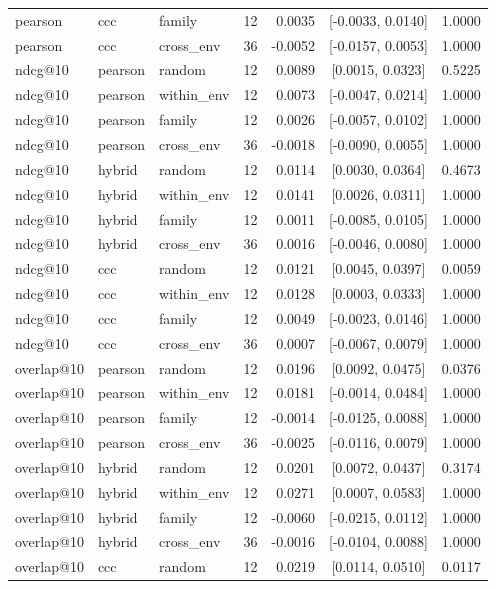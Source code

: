 \begin{longtable}{lllrrcc}
pearson & ccc & family & 12 & 0.0035 & [-0.0033, 0.0140] & 1.0000 \\
pearson & ccc & cross\_env & 36 & -0.0052 & [-0.0157, 0.0053] & 1.0000 \\
ndcg@10 & pearson & random & 12 & 0.0089 & [0.0015, 0.0323] & 0.5225 \\
ndcg@10 & pearson & within\_env & 12 & 0.0073 & [-0.0047, 0.0214] & 1.0000 \\
ndcg@10 & pearson & family & 12 & 0.0026 & [-0.0057, 0.0102] & 1.0000 \\
ndcg@10 & pearson & cross\_env & 36 & -0.0018 & [-0.0090, 0.0055] & 1.0000 \\
ndcg@10 & hybrid & random & 12 & 0.0114 & [0.0030, 0.0364] & 0.4673 \\
ndcg@10 & hybrid & within\_env & 12 & 0.0141 & [0.0026, 0.0311] & 1.0000 \\
ndcg@10 & hybrid & family & 12 & 0.0011 & [-0.0085, 0.0105] & 1.0000 \\
ndcg@10 & hybrid & cross\_env & 36 & 0.0016 & [-0.0046, 0.0080] & 1.0000 \\
ndcg@10 & ccc & random & 12 & 0.0121 & [0.0045, 0.0397] & 0.0059 \\
ndcg@10 & ccc & within\_env & 12 & 0.0128 & [0.0003, 0.0333] & 1.0000 \\
ndcg@10 & ccc & family & 12 & 0.0049 & [-0.0023, 0.0146] & 1.0000 \\
ndcg@10 & ccc & cross\_env & 36 & 0.0007 & [-0.0067, 0.0079] & 1.0000 \\
overlap@10 & pearson & random & 12 & 0.0196 & [0.0092, 0.0475] & 0.0376 \\
overlap@10 & pearson & within\_env & 12 & 0.0181 & [-0.0014, 0.0484] & 1.0000 \\
overlap@10 & pearson & family & 12 & -0.0014 & [-0.0125, 0.0088] & 1.0000 \\
overlap@10 & pearson & cross\_env & 36 & -0.0025 & [-0.0116, 0.0079] & 1.0000 \\
overlap@10 & hybrid & random & 12 & 0.0201 & [0.0072, 0.0437] & 0.3174 \\
overlap@10 & hybrid & within\_env & 12 & 0.0271 & [0.0007, 0.0583] & 1.0000 \\
overlap@10 & hybrid & family & 12 & -0.0060 & [-0.0215, 0.0112] & 1.0000 \\
overlap@10 & hybrid & cross\_env & 36 & -0.0016 & [-0.0104, 0.0088] & 1.0000 \\
overlap@10 & ccc & random & 12 & 0.0219 & [0.0114, 0.0510] & 0.0117 \\

\end{longtable}
